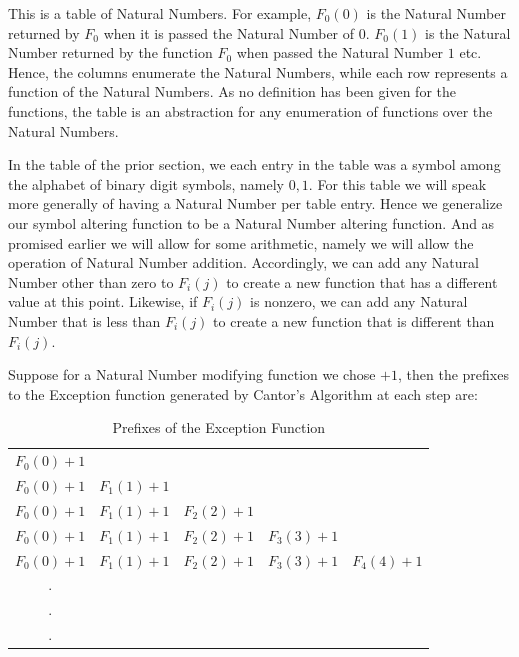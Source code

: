 \documentclass{article}
\begin{document}
    This is a table of Natural Numbers.  For example, \(F_0(0)\) is the Natural Number returned by \(F_0\) when it is passed the Natural Number of \(0\).  \(F_0(1)\) is the Natural Number returned by the function \(F_0\) when passed the Natural Number \(1\) etc.  Hence, the columns enumerate the Natural Numbers, while each row represents a function of the Natural Numbers. As no definition has been given for the functions, the table is an abstraction for any enumeration of functions over the Natural Numbers.

 	In the table of the prior section, we each entry in the table was a symbol among the alphabet of binary digit symbols, namely \({0,1}\). For this table we will speak more generally of having a Natural Number per table entry.  Hence we generalize our symbol altering function to be a Natural Number altering function.  And as promised earlier we will allow for some arithmetic, namely we will allow the operation of Natural Number addition. Accordingly, we can add any Natural Number other than zero to \(F_i(j)\) to create a new function that has a different value at this point. Likewise, if \(F_i(j)\) is nonzero, we can add any Natural Number that is less than \(F_i(j)\) to create a new function that is different than \(F_i(j)\).
 	
 	Suppose for a Natural Number modifying function we chose \(+1\), then the prefixes to the Exception function generated by Cantor's Algorithm at each step are:
	 	
	\begin{table}[H]
		\centering
		\begin{tabular}{c c c c c}
			\( F_0(0) + 1\) & & & &  \\
			\( F_0(0) + 1\) & \( F_1(1) + 1\) & & &  \\
			\( F_0(0) + 1\) & \( F_1(1) + 1\) & \( F_2(2) + 1\) & &  \\
			\( F_0(0) + 1\) & \( F_1(1) + 1\) & \( F_2(2) + 1\) & \( F_3(3) + 1\) &  \\
			\( F_0(0) + 1\) & \( F_1(1) + 1\) & \( F_2(2) + 1\) & \( F_3(3) + 1\) & \( F_4(4) + 1\)  \\
			. &  &  & &  \\
			. &  &  & &   \\
			. &  &  & &   \\
		\end{tabular}
		\caption{Prefixes of the Exception Function}
		\label{tab:exception_prefixes}
	\end{table}
\end{document}
